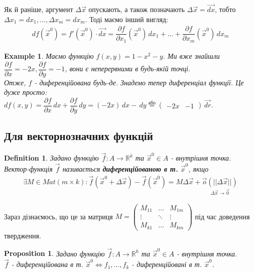 \documentclass[a4paper, 10pt]{article}
\def\departial#1#2{\dfrac{\partial {#1}}{\partial {#2}}}
\theoremstyle{theoremdd}
\theoremstyle{theoremdd}
\newtheorem{definition}[theorem]{Definition}
\theoremstyle{theoremdd}
\theoremstyle{theoremdd}
\newtheorem{example}[theorem]{Example}
\theoremstyle{theoremdd}
\newtheorem{proposition}[theorem]{Proposition}
\theoremstyle{theoremdd}
\theoremstyle{theoremdd}
\theoremstyle{theoremdd}
\begin{document}
Як й раніше, аргумент $\Delta \vec{x}$ опускають, а також позначають $\Delta \vec{x}= \vec{dx}$, тобто \\ $\Delta x_1 = dx_1, \dots, \Delta x_m = dx_m$. Тоді маємо інший вигляд:
\begin{align*}
df(\vec{x}^0) = f'(\vec{x}^0) \cdot \vec{dx} = \departial{f}{x_1}(\vec{x}^0)\,dx_1 + \dots + \departial{f}{x_m}(\vec{x}^0)\,dx_m
\end{align*}

\begin{example}
Маємо функцію $f(x,y) = 1-x^2 - y$. Ми вже знайшли $\departial{f}{x} = -2x, \departial{f}{y} = -1$, вони є неперервними в будь-якій точці.\\
Отже, $f$ - диференційована будь-де. Знадемо тепер диференціал функції. Це дуже просто:\\
$d f(x,y) = \departial{f}{x}\,dx + \departial{f}{y}\,dy = (-2x)\,dx -\,dy \overset{\text{або}}{=} \begin{pmatrix}
-2x & -1
\end{pmatrix} \, \vec{dr}$.
\end{example}

\subsection{Для векторнозначних функцій}
\begin{definition}
Задано функцію $\vec{f}: A \to \mathbb{R}^k$ та $\vec{x}^0 \in A$ - внутрішня точка.\\
Вектор-функція $\vec{f}$ називається \textbf{диференційованою в т.} $\vec{x}^0$, якщо
\begin{align*}
\exists M \in Mat(m \times k): \vec{f}(\vec{x}^0 + \Delta \vec{x}) - \vec{f}(\vec{x}^0) = M \Delta \vec{x} + \underset{\Delta \vec{x} \to \vec{0}}{\vec{o}(||\Delta \vec{x}||)}
\end{align*}
\end{definition}
Зараз дізнаємось, що це за матриця $M = \begin{pmatrix}
M_{11} & \dots & M_{1m} \\
\vdots & \ddots & \vdots \\
M_{k1} & \dots & M_{km}
\end{pmatrix}$ під час доведення твердження.

\begin{proposition}
Задано функцію $\vec{f}: A \to \mathbb{R}^k$ та $\vec{x}^0 \in A$ - внутрішня точка.\\
$\vec{f}$ - диференційована в т. $\vec{x}^0 \iff f_1,\dots,f_k$ - диференційовані в т. $\vec{x}^0$.
\end{proposition}
\end{document}

